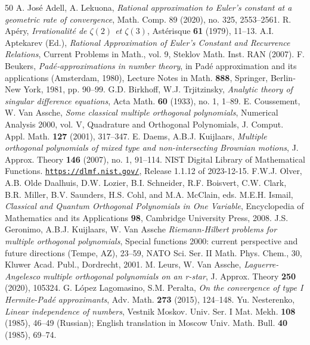 \documentclass[a4paper,12pt,oneside]{article}
\theoremstyle{definition}
\begin{document}
\begin{thebibliography}{50}
 A. José Adell, A. Lekuona, 
\textit{Rational approximation to Euler's constant at a geometric rate of convergence},
Math. Comp. 89 (2020), no. 325, 2553--2561.
 R. Ap\'ery, 
\textit{Irrationalit\'e de $\zeta(2)$ et $\zeta(3)$}, 
Ast\'erisque \textbf{61} (1979), 11--13.
 A.I. Aptekarev (Ed.), 
\textit{Rational Approximation of Euler's Constant and Recurrence Relations}, 
Current Problems in Math., vol. 9, Steklov Math. Inst. RAN (2007).
 F. Beukers, 
\textit{Pad\'e‐approximations in number theory},
in Pad\'e approximation and its applications (Amsterdam, 1980), 
Lecture Notes in Math. \textbf{888}, Springer, Berlin‐New York, 1981, pp. 90--99.
 G.D. Birkhoff, W.J. Trjitzinsky, 
\textit{Analytic theory of singular difference equations},
Acta Math. \textbf{60} (1933), no. 1, 1--89.
 E. Coussement, W. Van Assche,
\textit{Some classical multiple orthogonal polynomials},
Numerical Analysis 2000, vol. V, Quadrature and Orthogonal Polynomials, J. Comput. Appl. Math. \textbf{127} (2001), 317–347.
 E. Daems, A.B.J. Kuijlaars,
\textit{Multiple orthogonal polynomials of mixed type and non-intersecting Brownian motions},
J. Approx. Theory \textbf{146} (2007), no. 1, 91--114. 
 NIST Digital Library of Mathematical Functions. \href{https://dlmf.nist.gov/}{\texttt{https://dlmf.nist.gov/}}, Release 1.1.12 of 2023-12-15. F.W.J. Olver, A.B. Olde Daalhuis, D.W. Lozier, B.I. Schneider, R.F. Boisvert, C.W. Clark, B.R. Miller, B.V. Saunders, H.S. Cohl, and M.A. McClain, eds.
 M.E.H. Ismail, 
\textit{Classical and Quantum Orthogonal Polynomials in One Variable},
Encyclopedia of Mathematics and its Applications \textbf{98}, Cambridge University Press, 2008.
 J.S. Geronimo, A.B.J. Kuijlaars, W. Van Assche
\textit{Riemann-Hilbert problems for multiple orthogonal polynomials}, Special functions 2000: current perspective and future directions (Tempe, AZ), 23--59, NATO Sci. Ser. II Math. Phys. Chem., 30, Kluwer Acad. Publ., Dordrecht, 2001.
   M. Leurs, W. Van Assche,
\textit{Laguerre-Angelesco multiple orthogonal polynomials on an r-star},
J. Approx. Theory \textbf{250} (2020), 105324.
 G. López Lagomasino, S.M. Peralta,
\textit{On the convergence of type I Hermite-Padé approximants},
Adv. Math. \textbf{273} (2015), 124--148.
 Yu. Nesterenko, 
\textit{Linear independence of numbers},
Vestnik Moskov. Univ. Ser. I Mat. Mekh. \textbf{108} (1985), 46--49 (Russian); English translation in Moscow Univ. Math. Bull. \textbf{40} (1985), 69--74.

\end{thebibliography}
\end{document}
